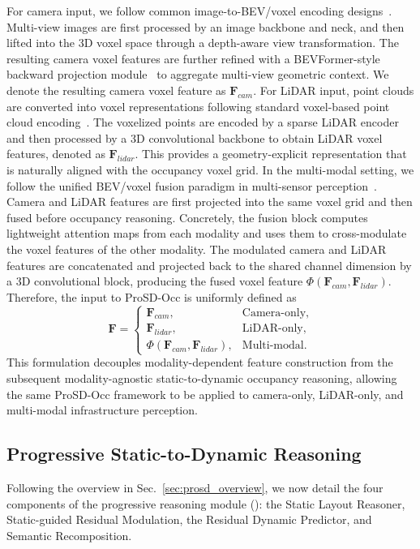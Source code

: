 For camera input, we follow common image-to-BEV/voxel encoding
designs~\cite{BEVDet,BEVDepth}. Multi-view images are first processed by an
image backbone and neck, and then lifted into the 3D voxel space through a
depth-aware view transformation. The resulting camera voxel features are
further refined with a BEVFormer-style backward projection module~\cite{BEVFormer}
to aggregate multi-view geometric context. We denote the resulting camera voxel
feature as $\bm{F}_{cam}$.
For LiDAR input, point clouds are converted into voxel representations following
standard voxel-based point cloud encoding~\cite{VoxelNet,PointPillars}. The
voxelized points are encoded by a sparse LiDAR encoder and then processed by a
3D convolutional backbone to obtain LiDAR voxel features, denoted as
$\bm{F}_{lidar}$. This provides a geometry-explicit representation that is
naturally aligned with the occupancy voxel grid.
In the multi-modal setting, we follow the unified BEV/voxel fusion paradigm in
multi-sensor perception~\cite{BEVFusion,OpenOccupancy}. Camera and LiDAR
features are first projected into the same voxel grid and then fused before
occupancy reasoning. Concretely, the fusion block computes lightweight
attention maps from each modality and uses them to cross-modulate the voxel
features of the other modality. The modulated camera and LiDAR features are
concatenated and projected back to the shared channel dimension by a 3D
convolutional block, producing the fused voxel feature
$\Phi(\bm{F}_{cam},\bm{F}_{lidar})$.
Therefore, the input to ProSD-Occ is uniformly defined as
\begin{equation}
  \bm{F} =
  \begin{cases}
  \bm{F}_{cam}, & \text{Camera-only},\\
  \bm{F}_{lidar}, & \text{LiDAR-only},\\
  \Phi(\bm{F}_{cam},\bm{F}_{lidar}), & \text{Multi-modal}.
  \end{cases}
\end{equation}
This formulation decouples modality-dependent feature construction from the
subsequent modality-agnostic static-to-dynamic occupancy reasoning, allowing
the same ProSD-Occ framework to be applied to camera-only, LiDAR-only, and
multi-modal infrastructure perception.

\subsection{Progressive Static-to-Dynamic Reasoning}
\label{sec:prosd_reasoning}
Following the overview in Sec.~\ref{sec:prosd_overview}, we now detail the
four components of the progressive reasoning module
(): the Static Layout Reasoner,
Static-guided Residual Modulation, the Residual Dynamic Predictor, and Semantic
Recomposition.

